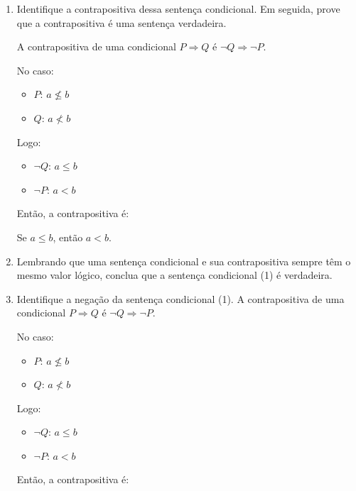 \documentclass[12pt,a4paper]{article}
\begin{document}
    \begin{enumerate}[label= (\alph*)]
        \item Identifique a contrapositiva dessa sentença condicional. Em seguida, prove que a contrapositiva é
        uma sentença verdadeira.

        A contrapositiva de uma condicional \( P \Rightarrow Q \) é \( \neg Q \Rightarrow \neg P \).

        No caso:
        \begin{itemize}
            \item \( P \): \( a \nleq b \)
            \item \( Q \): \( a \nless b \)
        \end{itemize}
        
        Logo:
        \begin{itemize}
            \item \( \neg Q \): \( a \leq b \)
            \item \( \neg P \): \( a < b \)
        \end{itemize}
        
        Então, a contrapositiva é:
        
        Se \( a \leq b \), então \( a < b \).


        \item Lembrando que uma sentença condicional e sua contrapositiva sempre têm o mesmo valor lógico, conclua que a sentença condicional (1) é verdadeira.
        
        \item Identifique a negação da sentença condicional (1).
        A contrapositiva de uma condicional \( P \Rightarrow Q \) é \( \neg Q \Rightarrow \neg P \).

        No caso:
        \begin{itemize}
            \item \( P \): \( a \nleq b \)
            \item \( Q \): \( a \nless b \)
        \end{itemize}

        Logo:
        \begin{itemize}
            \item \( \neg Q \): \( a \leq b \)
            \item \( \neg P \): \( a < b \)
        \end{itemize}

        Então, a contrapositiva é:


\end{enumerate}
\end{document}
